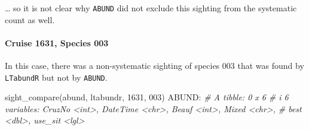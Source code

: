 \documentclass[
]{book}
\newenvironment{Shaded}{\begin{snugshade}}{\end{snugshade}}
\newcommand{\CommentTok}[1]{\textcolor[rgb]{0.56,0.35,0.01}{\textit{#1}}}
\newcommand{\DecValTok}[1]{\textcolor[rgb]{0.00,0.00,0.81}{#1}}
\newcommand{\FunctionTok}[1]{\textcolor[rgb]{0.00,0.00,0.00}{#1}}
\newcommand{\NormalTok}[1]{#1}
\newcommand{\SpecialCharTok}[1]{\textcolor[rgb]{0.00,0.00,0.00}{#1}}
\newcommand{\StringTok}[1]{\textcolor[rgb]{0.31,0.60,0.02}{#1}}
\begin{document}
\ldots{} so it is not clear why \texttt{ABUND} did not exclude this sighting from the systematic count as well.

\hypertarget{cruise-1631-species-003}{%
\paragraph*{Cruise 1631, Species 003}\label{cruise-1631-species-003}}

In this case, there was a non-systematic sighting of species 003 that was found by \texttt{LTabundR} but not by \texttt{ABUND}.

\begin{Shaded}
\begin{Highlighting}[]
\FunctionTok{sight\_compare}\NormalTok{(abund, ltabundr, }\DecValTok{1631}\NormalTok{, }\StringTok{\textquotesingle{}003\textquotesingle{}}\NormalTok{)}
\NormalTok{ABUND}\SpecialCharTok{:}
\CommentTok{\# A tibble: 0 x 6}
\CommentTok{\# i 6 variables: CruzNo \textless{}int\textgreater{}, DateTime \textless{}chr\textgreater{}, Beauf \textless{}int\textgreater{}, Mixed \textless{}chr\textgreater{},}
\CommentTok{\#   best \textless{}dbl\textgreater{}, use\_sit \textless{}lgl\textgreater{}}


\end{Highlighting}
\end{Shaded}
\end{document}

